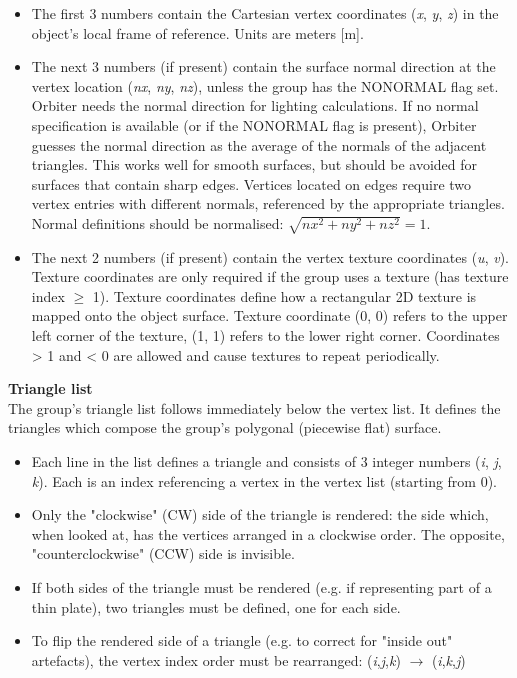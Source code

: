\documentclass[Orbiter Developer Manual.tex]{subfiles}
\begin{document}
\begin{itemize}
\item The first 3 numbers contain the Cartesian vertex coordinates (\textit{x}, \textit{y}, \textit{z}) in the object's local frame of reference. Units are meters [m].
\item The next 3 numbers (if present) contain the surface normal direction at the vertex location (\textit{nx}, \textit{ny}, \textit{nz}), unless the group has the NONORMAL flag set. Orbiter needs the normal direction for lighting calculations. If no normal specification is available (or if the NONORMAL flag is present), Orbiter guesses the normal direction as the average of the normals of the adjacent triangles. This works well for smooth surfaces, but should be avoided for surfaces that contain sharp edges. Vertices located on edges require two vertex entries with different normals, referenced by the appropriate triangles. Normal definitions should be normalised: $\sqrt{nx^{2}+ny^{2}+nz^{2}} = 1$.
\item The next 2 numbers (if present) contain the vertex texture coordinates (\textit{u}, \textit{v}). Texture coordinates are only required if the group uses a texture (has texture index $\geq$ 1). Texture coordinates define how a rectangular 2D texture is mapped onto the object surface. Texture coordinate (0, 0) refers to the upper left corner of the texture, (1, 1) refers to the lower right corner. Coordinates > 1 and < 0 are allowed and cause textures to repeat periodically.
\end{itemize}


\noindent
\textbf{Triangle list}\\
The group's triangle list follows immediately below the vertex list. It defines the triangles which compose the group's polygonal (piecewise flat) surface.

\begin{itemize}
\item Each line in the list defines a triangle and consists of 3 integer numbers (\textit{i}, \textit{j}, \textit{k}). Each is an index referencing a vertex in the vertex list (starting from 0).
\item Only the "clockwise" (CW) side of the triangle is rendered: the side which, when looked at, has the vertices arranged in a clockwise order. The opposite, "counterclockwise" (CCW) side is invisible.
\item If both sides of the triangle must be rendered (e.g. if representing part of a thin plate), two triangles must be defined, one for each side.
\item To flip the rendered side of a triangle (e.g. to correct for "inside out" artefacts), the vertex index order must be rearranged: (\textit{i},\textit{j},\textit{k}) $\rightarrow$ (\textit{i},\textit{k},\textit{j})
\end{itemize}
\end{document}
